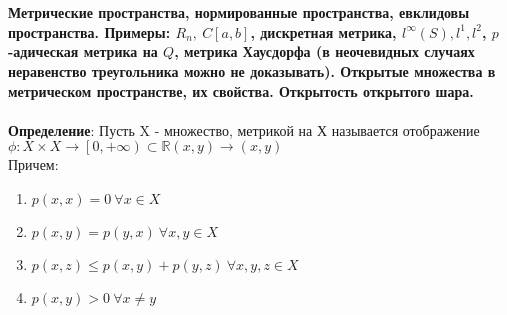 \section{}
	\textbf{Метрические пространства, нормированные пространства, евклидовы пространства. Примеры: $R_n,\ C[a, b]$, дискретная метрика, $l^{\infty}(S), l^1, l^2$, $p$-адическая метрика на $Q$, метрика Хаусдорфа (в неочевидных случаях неравенство треугольника можно не доказывать). Открытые множества в метрическом пространстве, их свойства. Открытость открытого шара.}\\
	\\
	\textbf{Определение}: Пусть X - множество, метрикой на Х называется отображение $\phi: X \times X \rightarrow \left[0,+ \infty\right)\subset\mathbb{R} (x,y)\rightarrow (x,y)$\\
	Причем:
	\begin{enumerate}
		\item $p(x,x) = 0\ \forall x \in X$
		\item $p(x,y) = p(y,x)\ \forall x,y \in X$
		\item $p(x,z)\leqslant p(x,y) + p(y,z)\ \forall x,y,z \in X$
		\item $p(x,y)>0\ \forall x\neq y$
	\end{enumerate}
	
